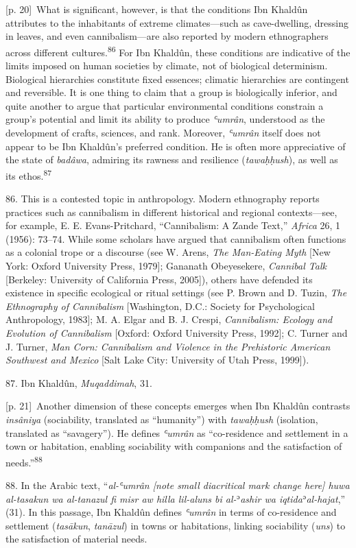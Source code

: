 \documentclass[10pt,a4paper]{article}
\begin{document}
{\scriptsize\color{gray} [p. 20]}\ What is significant, however, is that the conditions Ibn Khaldûn attributes to the inhabitants of extreme climates—such as cave-dwelling, dressing in leaves, and even cannibalism—are also reported by modern ethnographers across different cultures.\nobreak\textsuperscript{86} For Ibn Khaldûn, these conditions are indicative of the limits imposed on human societies by climate, not of biological determinism. Biological hierarchies constitute fixed essences; climatic hierarchies are contingent and reversible. It is one thing to claim that a group is biologically inferior, and quite another to argue that particular environmental conditions constrain a group’s potential and limit its ability to produce \textit{ʿumrân}, understood as the development of crafts, sciences, and rank. Moreover, \textit{ʿumrân} itself does not appear to be Ibn Khaldûn’s preferred condition. He is often more appreciative of the state of \textit{badâwa}, admiring its rawness and resilience (\textit{tawaḥḥush}), as well as its ethos.\nobreak\textsuperscript{87}\par{\small 86. This is a contested topic in anthropology. Modern ethnography reports practices such as cannibalism in different historical and regional contexts—see, for example, E. E. Evans-Pritchard, “Cannibalism: A Zande Text,” \textit{Africa} 26, 1 (1956): 73–74. While some scholars have argued that cannibalism often functions as a colonial trope or a discourse (see W. Arens, \textit{The Man-Eating Myth} [New York: Oxford University Press, 1979]; Gananath Obeyesekere, \textit{Cannibal Talk} [Berkeley: University of California Press, 2005]), others have defended its existence in specific ecological or ritual settings (see P. Brown and D. Tuzin, \textit{The Ethnography of Cannibalism} [Washington, D.C.: Society for Psychological Anthropology, 1983]; M. A. Elgar and B. J. Crespi, \textit{Cannibalism: Ecology and Evolution of Cannibalism} [Oxford: Oxford University Press, 1992]; C. Turner and J. Turner, \textit{Man Corn: Cannibalism and Violence in the Prehistoric American Southwest and Mexico} [Salt Lake City: University of Utah Press, 1999]).\par}{\small 87. Ibn Khaldûn, \textit{Muqaddimah}, 31.\par}
{\scriptsize\color{gray} [p. 21]}\ Another dimension of these concepts emerges when Ibn Khaldûn contrasts \textit{insâniya} (sociability, translated as “humanity”) with \textit{tawaḥḥush} (isolation, translated as “savagery”). He defines \textit{ʿumrân} as “co-residence and settlement in a town or habitation, enabling sociability with companions and the satisfaction of needs.”\nobreak\textsuperscript{88}\par{\small 88. In the Arabic text, “\textit{al-ʿumrân [note small diacritical mark change here] huwa al-tasakun wa al-tanazul fi misr aw hilla lil-aluns bi al-}ʾ\textit{ashir wa iqtida}ʾ\textit{al-hajat},” (31). In this passage, Ibn Khaldûn defines \textit{ʿumrân} in terms of co-residence and settlement (\textit{tasākun}, \textit{tanāzul}) in towns or habitations, linking sociability (\textit{uns}) to the satisfaction of material needs.\par}
\end{document}
